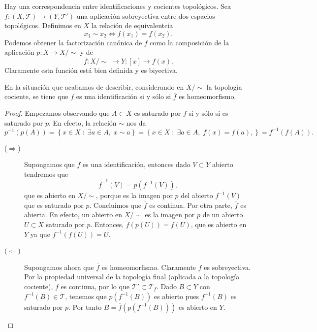 Hay una correspondencia entre identificaciones y cocientes topológicos. Sea $\displaystyle f : \left(X, \mathcal{T}\right)\to \left(Y, \mathcal{T}'\right) $ una aplicación sobreyectiva entre dos espacios topológicos. Definimos en $\displaystyle X $ la relación de equivalentcia
\[x_{1} \sim x_{2} \iff f\left(x_{1}\right)=f\left(x_{2}\right) .\]
Podemos obtener la factorización canónica de $\displaystyle f $ como la composición de la aplicación $\displaystyle p : X \to X / \sim  $ y de 
\[\overline{f} : X / \sim \; \to Y : \left[x\right] \to f\left(x\right) .\]
Claramente esta función está bien definida y es biyectiva.
\begin{prop}
En la situación que acabamos de describir, considerando en $\displaystyle X/\sim $ la topología cociente, se tiene que $\displaystyle f $ es una identificación si y sólo si $\displaystyle \overline{f} $ es homeomorfismo.
\end{prop}
\begin{proof}
Empezamos observando que $\displaystyle A \subset X $ es saturado por $\displaystyle f $ si y sólo si es saturado por $\displaystyle p $. En efecto, la relación $\displaystyle \sim $ nos da
\[p^{-1}\left(p\left(A\right)\right)= \left\{ x \in X \; : \; \exists a \in A, \; x \sim a\right\} = \left\{ x \in X \; : \; \exists a \in A, \; f\left(x\right)=f\left(a\right),\right\} = f^{-1}\left(f\left(A\right)\right) .\]
\begin{description}
\item[($\displaystyle \Rightarrow $)] Supongamos que $\displaystyle f $ es una identificación, entonces dado $\displaystyle V \subset Y $ abierto tendremos que 
\[\overline{f}^{-1}\left(V\right)=p\left(f^{-1}\left(V\right)\right) ,\]
que es abierto en $\displaystyle X/\sim $, porque es la imagen por $\displaystyle p $ del abierto $\displaystyle f^{-1}\left(V\right) $ que es saturado por $\displaystyle p $. Concluimos que $\displaystyle \overline{f} $ es continua. 
Por otra parte, $\displaystyle \overline{f} $ es abierta. En efecto, un abierto en $\displaystyle X / \sim  $ es la imagen por $\displaystyle p $ de un abierto $\displaystyle U \subset X $ saturado por $\displaystyle p $. Entonces, $\displaystyle \overline{f}\left(p\left(U\right)\right)=f\left(U\right) $, que es abierto en $\displaystyle Y $ ya que $\displaystyle f^{-1}\left(f\left(U\right)\right)=U $.
\item[($\displaystyle \Leftarrow $)] Supongamos ahora que $\displaystyle \overline{f} $ es homeomorfismo. Claramente $\displaystyle f $ es sobreyectiva. Por la propiedad universal de la topología final (aplicada a la topología cociente), $\displaystyle f $ es continua, por lo que $\displaystyle \mathcal{T}' \subset \mathcal{T}_{f} $. Dado $\displaystyle B \subset Y $ con $\displaystyle f^{-1}\left(B\right)\in \mathcal{T} $, tenemos que $\displaystyle p\left(f^{-1}\left(B\right)\right) $ es abierto pues $\displaystyle f^{-1}\left(B\right) $ es saturado por $\displaystyle p $. Por tanto $\displaystyle B = \overline{f}\left(p\left(f^{-1}\left(B\right)\right)\right) $ es abierto en $\displaystyle Y $.
\end{description}
\end{proof}
